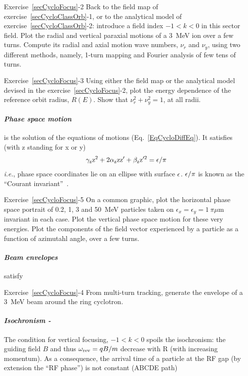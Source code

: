 \smallskip
\noindent {\small $\bullet$} Exercise~\ref{secCycloFocus}-2
Back to the field map of exercise~\ref{secCycloClassOrb}-1, or to the analytical model 
of exercise~\ref{secCycloClassOrb}-2: introduce a field index $-1<k<0$ in this sector field. 
Plot the radial and vertical paraxial motions of a 3~MeV ion over a few turns. 
Compute its radial and axial motion wave numbers, $\nu_r$ and $\nu_y$, 
using two different methods, namely, 1-turn mapping and  Fourier analysis of few tens of turns. 


\smallskip
\noindent {\small $\bullet$} Exercise~\ref{secCycloFocus}-3
Using either the field map or the analytical model devised in the  exercise~\ref{secCycloFocus}-2, 
 plot the energy dependence of the reference orbit radius, $R(E)$. 
Show that $\nu_r^2 + \nu_y^2=1$, at all radii.


\paragraph{\sl Phase space motion  \label{secCycloPhasSpac} }
 is the solution of the equations of motions (Eq.~\ref{EqCycloDiffEq}). 
It satisfies (with z standing for x or y)
\begin{equation}
\label{EqCycloInvariant}
\rm
\gamma_z z^2 + 2 \alpha_z z z' + \beta_z z'^2 = \epsilon/\pi
\end{equation}
{\sl i.e.}, phase space coordinates lie on an ellipse with surface $\rm \epsilon$.  
$\rm \epsilon/\pi$ is known as the ``Courant invariant''~\cite{Courant}. 


\smallskip
\noindent {\small $\bullet$} Exercise~\ref{secCycloFocus}-5
On a common graphic, plot the horizontal phase space portrait of 0.2, 1, 3 and 50~MeV particles
taken on $\epsilon_x = \epsilon_y = 1\ \pi\mu$m invariant in each case.
Plot the vertical phase space motion for these very energies. 
Plot the components of the field vector experienced by a particle as a function of 
azimutahl angle, over a few turns.



\paragraph{\sl Beam envelopes  \label{secCycloEnvlps} }
satisfy 

\smallskip
\noindent {\small $\bullet$} Exercise~\ref{secCycloFocus}-4
From multi-turn tracking, generate the envelope of a 3~MeV beam around the ring cyclotron.  


\paragraph{\sl Isochronism  \label{secCycloIsochro} - }  
The  condition  for vertical focusing, $-1 < k <0$ 
spoils the isochronism: the guiding field $B$ and thus $\omega_{\rm rev} = qB/m$ decrease with R (with increasing momentum). 
 As a consequence, the arrival time of a particle at the RF gap (by 
extension the ``RF phase'') is not constant  (ABCDE path)


